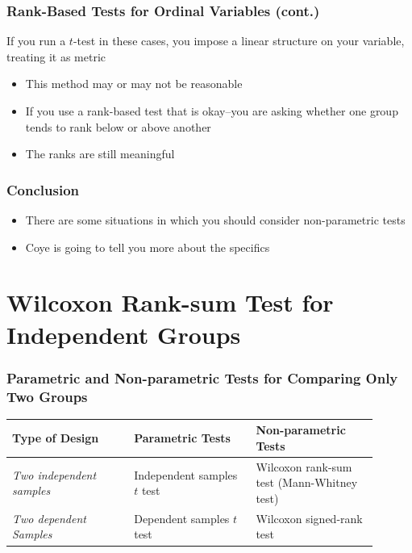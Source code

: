 \documentclass[12pt, block=fill]{beamer}
\begin{document}
\begin{frame}
  \frametitle{Rank-Based Tests for Ordinal Variables (cont.)}
  
  If you run a $t$-test in these cases, you impose a linear structure on your variable, treating it as metric
  \begin{itemize}
      \item This method may or may not be reasonable
      \item If you use a rank-based test that is okay--you are asking whether one group tends to rank below or above another 
      \item The ranks are still meaningful
  \end{itemize}
    
\end{frame}


\begin{frame}
  \frametitle{Conclusion}

  \begin{itemize}
    \item There are some situations in which you should consider non-parametric tests
    \item Coye is going to tell you more about the specifics
  \end{itemize}
  
\end{frame}











\section{Wilcoxon Rank-sum Test for Independent Groups}


\begin{frame}
  \frametitle{Parametric and Non-parametric Tests for Comparing Only Two Groups}

  \begin{center}
    \begin{tabular}{p{0.3\linewidth}||p{0.3\linewidth}|p{0.3\linewidth}}
      \textbf{Type of Design} & \textbf{Parametric Tests} & \textbf{Non-parametric Tests}  \\
      \hline \hline
      \textit{Two independent samples}  & Independent samples $t$ test & Wilcoxon rank-sum test (Mann-Whitney test) \\
      \hline
      \textit{Two dependent Samples } & Dependent samples $t$ test & Wilcoxon signed-rank test
    \end{tabular}   
  \end{center}

\end{frame}
\end{document}
